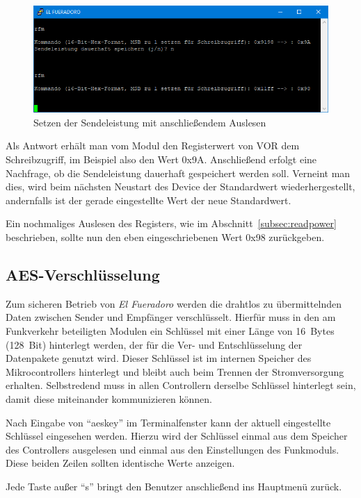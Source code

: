 \documentclass[paper=a4, parskip, numbers=noenddot, toc=listof, headsepline]{scrbook}
\newcommand{\anlage}{\emph{El Fueradoro}}
\begin{document}
						\begin{figure}
							\centering
							\includegraphics[width=.8\textwidth]{Bilder/rfmbefehl2}
							\caption{Setzen der Sendeleistung mit anschließendem Auslesen}
							\label{fig:rfmwrite}
						\end{figure}

						Als Antwort erhält man vom Modul den Registerwert von VOR dem Schreibzugriff, im Beispiel also den Wert 0x9A. Anschließend erfolgt eine Nachfrage, ob die Sendeleistung dauerhaft gespeichert werden soll. Verneint man dies, wird beim nächsten Neustart des Device der Standardwert wiederhergestellt, andernfalls ist der gerade eingestellte Wert der neue Standardwert.

						Ein nochmaliges Auslesen des Registers, wie im Abschnitt~\ref{subsec:readpower} beschrieben, sollte nun den eben eingeschriebenen Wert 0x98 zurückgeben.

				\subsection{AES-Verschlüsselung}
					\label{sec:encryption}

					Zum sicheren Betrieb von {\anlage} werden die drahtlos zu übermittelnden Daten zwischen Sender und Empfänger verschlüsselt. Hierfür muss in den am Funkverkehr beteiligten Modulen ein Schlüssel mit einer Länge von 16~Bytes (128~Bit) hinterlegt werden, der für die Ver- und Entschlüsselung der Datenpakete genutzt wird. Dieser Schlüssel ist im internen Speicher des Mikrocontrollers hinterlegt und bleibt auch beim Trennen der Stromversorgung erhalten. Selbstredend muss in allen Controllern derselbe Schlüssel hinterlegt sein, damit diese miteinander kommunizieren können.

					Nach Eingabe von \enquote{aeskey} im Terminalfenster kann der aktuell eingestellte Schlüssel eingesehen werden. Hierzu wird der Schlüssel einmal aus dem Speicher des Controllers ausgelesen und einmal aus den Einstellungen des Funkmoduls. Diese beiden Zeilen sollten identische Werte anzeigen.

					Jede Taste außer \enquote{s} bringt den Benutzer anschließend ins Hauptmenü zurück.
\end{document}
